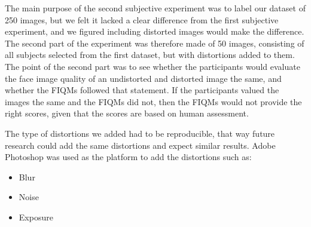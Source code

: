 The main purpose of the second subjective experiment was to label our dataset of 250 images, but we felt it lacked a clear difference from the first subjective experiment, and we figured including distorted images would make the difference. The second part of the experiment was therefore made of 50 images, consisting of all subjects selected from the first dataset, but with distortions added to them. The point of the second part was to see whether the participants would evaluate the face image quality of an undistorted and distorted image the same, and whether the FIQMs followed that statement. If the participants valued the images the same and the FIQMs did not, then the FIQMs would not provide the right scores, given that the scores are based on human assessment.   

The type of distortions we added had to be reproducible, that way future research could add the same distortions and expect similar results. Adobe Photoshop was used as the platform to add the distortions such as:

\begin{itemize}
    \item Blur
    \item Noise
    \item Exposure 
\end{itemize}